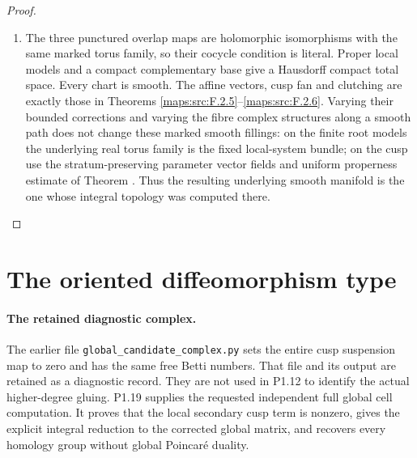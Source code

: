 \begin{proof}
\begin{enumerate}[label=\arabic*.]
The proof of Theorem  used only boundedness of $C$,
integrality of the standard cusp, and unimodularity of that
fan.  It therefore proves smoothness, proper discontinuity
and properness for this model without a symmetry condition
on $C$.  Glue by the displayed integral marking and use no
additional cusp translation.

\item The three punctured overlap maps are holomorphic isomorphisms
with the same marked torus family, so their cocycle condition
is literal.  Proper local models and a compact complementary
base give a Hausdorff compact total space.  Every chart is
smooth.  The affine vectors, cusp fan and clutching are exactly
those in Theorems \ref{maps:src:F.2.5}--\ref{maps:src:F.2.6}.  Varying their bounded corrections
and varying the fibre complex structures along a smooth path
does not change these marked smooth fillings: on the finite
root models the underlying real torus family is the fixed
local-system bundle; on the cusp use the stratum-preserving
parameter vector fields and uniform properness estimate of
Theorem .  Thus the resulting underlying smooth manifold
is the one whose integral topology was computed there.

\end{enumerate}
\end{proof}


\section{The oriented diffeomorphism type}

\paragraph{The retained diagnostic complex.}
The earlier file \texttt{global\_candidate\_complex.py} sets the entire
cusp suspension map to zero and has the same free Betti numbers.
That file and its output are retained as a diagnostic record.  They
are not used in P1.12 to identify the actual higher-degree gluing.
P1.19 supplies the requested independent full global cell computation.
It proves that the local secondary cusp term is nonzero, gives the
explicit integral reduction to the corrected global matrix, and
recovers every homology group without global Poincar\'e duality.

